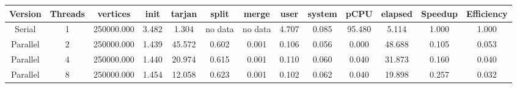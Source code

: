 \begin{tabular}{|c|c|c|c|c|c|c|c|c|c|c|c|c|}
\toprule
 Version &  Threads &   vertices &  init &  tarjan &   split &   merge &  user &  system &   pCPU &  elapsed &  Speedup &  Efficiency \\
\midrule
  Serial &        1 & 250000.000 & 3.482 &   1.304 & no data & no data & 4.707 &   0.085 & 95.480 &    5.114 &    1.000 &       1.000 \\
Parallel &        2 & 250000.000 & 1.439 &  45.572 &   0.602 &   0.001 & 0.106 &   0.056 &  0.000 &   48.688 &    0.105 &       0.053 \\
Parallel &        4 & 250000.000 & 1.440 &  20.974 &   0.615 &   0.001 & 0.110 &   0.060 &  0.040 &   31.873 &    0.160 &       0.040 \\
Parallel &        8 & 250000.000 & 1.454 &  12.058 &   0.623 &   0.001 & 0.102 &   0.062 &  0.040 &   19.898 &    0.257 &       0.032 \\
\bottomrule
\end{tabular}
